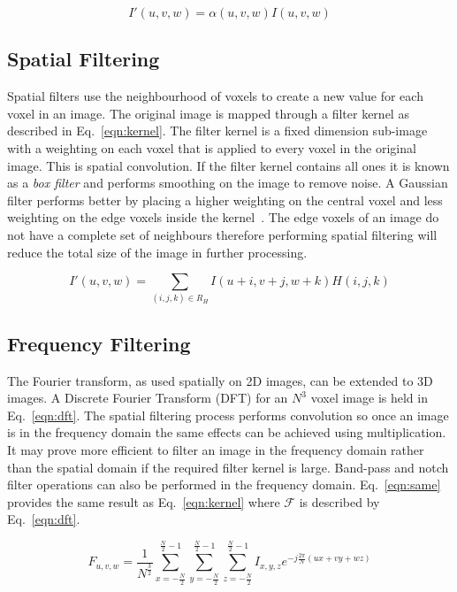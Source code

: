 \documentclass[journal]{IEEEtran}
\begin{document}
\begin{equation}
	I'(u,v,w) = \alpha(u,v,w)I(u,v,w)
	\label{eqn:point} 
\end{equation}



\subsection{Spatial Filtering}
\label{sec:spatial}
Spatial filters use the neighbourhood of voxels to create a new value for each voxel in an image. 
The original image is mapped through a filter kernel as described in Eq.~\eqref{eqn:kernel}.
The filter kernel is a fixed dimension sub-image with a weighting on each voxel that is applied to every voxel in the original image.
This is spatial convolution.
If the filter kernel contains all ones it is known as a \emph{box filter} and performs smoothing on the image to remove noise.
A Gaussian filter performs better by placing a higher weighting on the central voxel and less weighting on the edge voxels inside the kernel~\cite{lohmann1998volumetric}.
The edge voxels of an image do not have a complete set of neighbours therefore performing spatial filtering will reduce the total size of the image in further processing.

\begin{equation}
	I'(u,v,w) = \sum\limits_{(i,j,k) \in R_H} I(u + i,v + j, w + k)H(i,j,k)
	\label{eqn:kernel} 
\end{equation}



\subsection{Frequency Filtering}
The Fourier transform, as used spatially on 2D images, can be extended to 3D images.
A Discrete Fourier Transform (DFT) for an $N^3$ voxel image is held in Eq.~\eqref{eqn:dft}.
The spatial filtering process performs convolution so once an image is in the frequency domain the same effects can be achieved using multiplication.
It may prove more efficient to filter an image in the frequency domain rather than the spatial domain if the required filter kernel is large.
Band-pass and notch filter operations can also be performed in the frequency domain.
Eq.~\eqref{eqn:same} provides the same result as Eq.~\eqref{eqn:kernel} where $\mathcal{F}$ is described by Eq.~\eqref{eqn:dft}.

\begin{equation}
	F_{u,v,w} = \frac{1}{N^{\frac{3}{2}}} \sum\limits_{x=-\frac{N}{2}}^{\frac{N}{2}-1}\sum\limits_{y=-\frac{N}{2}}^{\frac{N}{2}-1}\sum\limits_{z=-\frac{N}{2}}^{\frac{N}{2}-1}I_{x,y,z}e^{-j\frac{2\pi}{N}(ux + vy + wz)}
	\label{eqn:dft} 
\end{equation}
\end{document}
